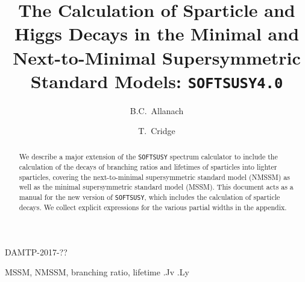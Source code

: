 \documentclass[final,3p,times,pdflatex]{elsarticle}
\begin{document}
\begin{frontmatter}

\begin{flushright}
DAMTP-2017-??\\
\end{flushright}

\title{The Calculation of Sparticle and Higgs Decays in the Minimal and Next-to-Minimal Supersymmetric Standard Models: {\tt SOFTSUSY4.0}}

\author[damtp]{B.C.~Allanach}
\author[damtp]{T.~Cridge}
\address[damtp]{DAMTP, CMS, University of Cambridge, Wilberforce road,
  Cambridge, CB3  0WA, United Kingdom}
\begin{abstract}
We describe a major extension of the {\tt SOFTSUSY} spectrum calculator to
include 
the calculation of the decays of branching ratios and lifetimes of sparticles
into lighter 
sparticles, covering  the next-to-minimal supersymmetric standard model
(NMSSM) as 
well as the minimal supersymmetric standard model (MSSM).
This document
acts as a manual for the
new version of {\tt SOFTSUSY}, which includes the calculation of sparticle
decays. We collect explicit expressions for the various partial widths in the
appendix. 
\end{abstract}

\begin{keyword}
MSSM, NMSSM, branching ratio, lifetime
.Jv
.Ly
\end{keyword}
\end{frontmatter}
\end{document}
